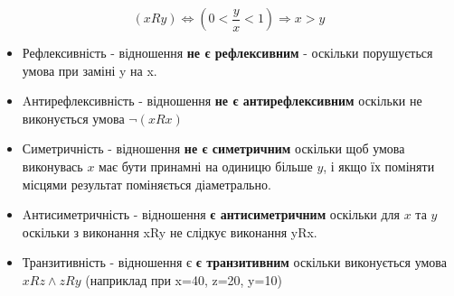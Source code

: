 \begin{center}\large{}\end{center}

  $$
  (xRy) \iff ( 0 < \dfrac{y}{x} < 1) \Rightarrow x > y
  $$




\begin{itemize}
  \item Рефлексивність - відношення \textbf{не є рефлексивним} - оскільки порушується умова при заміні y на x.
  \item Aнтирефлексивність - відношення \textbf{не є антирефлексивним} оскільки не виконується умова $\neg(xRx)$
  \item Симетричність - відношення \textbf{не є симетричним} оскільки щоб умова виконувась $x$ має бути принамні на одиницю більше $y$, і якщо їх поміняти місцями результат поміняється діаметрально.
  \item Aнтисиметричність - відношення \textbf{є антисиметричним} оскільки для $x$ та $y$ оскільки  з виконання xRy не слідкує виконання yRx.
  \item Транзитивність - відношення є \textbf{є транзитивним} оскільки виконується умова $xRz \wedge zRy$ (наприклад при x=40, z=20, y=10)
  \end{itemize}
